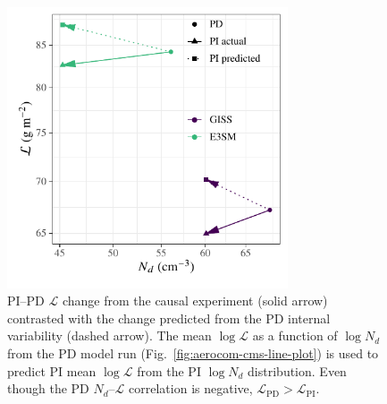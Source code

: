 \documentclass[acp, manuscript]{copernicus}\usepackage[]{graphicx}\usepackage[]{xcolor}
\newenvironment{knitrout}{}{} %
\newcommand\nd{\ensuremath{N_d}}
\newcommand\lwp{\ensuremath{\mathcal L}}
\begin{document}
\begin{figure}[t]
  \centering

\begin{knitrout}
\color{fgcolor}

{\centering \includegraphics[width=8.3cm]{figure/multimodel-delta-pred-actual-plot-1} 

}


\end{knitrout}
  \caption{PI--PD \lwp{} change from the causal experiment (solid arrow)
    contrasted with the change predicted from the PD internal variability
    (dashed arrow).  The mean $\log\lwp$ as a function of $\log\nd$ from the PD
    model run (Fig.~\ref{fig:aerocom-cms-line-plot}) is used to predict PI mean $\log\lwp$ from the PI $\log\nd$
    distribution.
    Even though the PD \nd--\lwp{} correlation is negative,
    $\lwp_\text{PD} > \lwp_\text{PI}$.}
  \label{fig:pdpi-causal-pred}
\end{figure}
%
\clearpage
%
\end{document}
